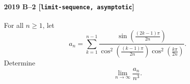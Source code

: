 \paragraph{2019 B--2 \textnormal{[\texttt{limit-sequence, asymptotic}]}}
For all $n \geq 1$, let
\[
a_n = \sum_{k=1}^{n-1} \frac{\sin \left( \frac{(2k-1)\pi}{2n} \right)}{\cos^2 \left( \frac{(k-1)\pi}{2n} \right) \cos^2 \left( \frac{k\pi}{2n} \right)}.
\]
Determine
\[
\lim_{n \to \infty} \frac{a_n}{n^3}.
\]
